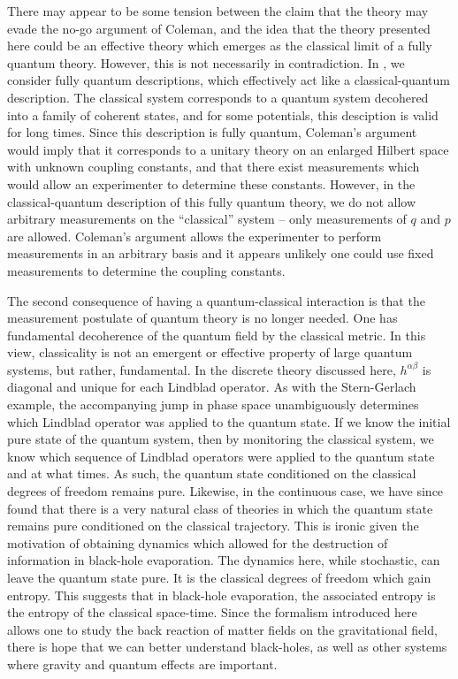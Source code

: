 \documentclass[aps,pra,showpacs,citeautoscript,amsmath,amssymb,floatfix,superscriptaddress,bbm, verbatim,amsfonts,changes,12pt,nofootinbib,longbibliography]{revtex4-2}
\def\ab{^{\alpha\beta}}
\begin{document}
\label{par:tension}
	There may appear to be some tension  between the claim that the theory may evade the no-go argument of Coleman, and the idea that the theory presented here could be an effective theory which emerges as the classical limit of a fully quantum theory. However, this is not necessarily in contradiction.
	In \cite{UCLQQtoCQ}, we consider fully quantum descriptions, which effectively act like a classical-quantum description. The classical system corresponds to a quantum system decohered into a family of coherent states, and for some potentials, this desciption is valid for long times. Since this description is fully quantum, Coleman's argument would imply that it corresponds to a unitary theory on an enlarged Hilbert space with unknown coupling constants, and that there exist measurements which would allow an experimenter to determine these constants.  However, in the classical-quantum description of this fully quantum theory, we do not allow arbitrary measurements on the ``classical'' system -- only measurements of $q$ and $p$ are allowed. Coleman's argument allows the experimenter to perform measurements in an arbitrary basis and it appears unlikely one could use fixed measurements to determine the coupling constants. 


The second consequence of having a quantum-classical interaction is that the measurement postulate of quantum theory is no longer needed. One has fundamental decoherence of the quantum field by the classical metric. In this view, classicality is not an emergent or effective property of large quantum systems, but rather, fundamental.
In the discrete theory discussed here, $h\ab$ is diagonal and unique for each Lindblad operator. As with the Stern-Gerlach example, the accompanying jump in phase space unambiguously determines which Lindblad operator was applied to the quantum state. If we know the initial pure state of the quantum system, then by monitoring the classical system, we know which sequence of Lindblad operators were applied to the quantum state and at what times. As such, the quantum state conditioned on the classical degrees of freedom remains pure. Likewise, in the continuous case, we have since found that 
there is a very natural class of theories in which the quantum state remains pure conditioned on the classical trajectory\cite{layton2022semi}.
	This is 
ironic given the motivation of obtaining dynamics which allowed for the destruction of information in black-hole evaporation. The dynamics here, while stochastic, can leave the quantum state pure. It is the classical degrees of freedom which gain entropy.
This suggests that in black-hole evaporation, the associated entropy is the entropy of the classical space-time. Since the formalism introduced here allows one to study the back reaction of matter fields on the gravitational field, there is hope that we can better understand black-holes, as well as other systems where gravity and quantum effects are important.
\end{document}
